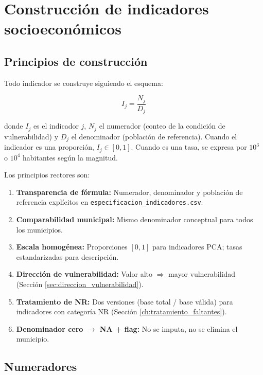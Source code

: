 \section{Construcción de indicadores socioeconómicos}
\label{ch:indicadores}

\subsection{Principios de construcción}
\label{sec:principios_construccion}

Todo indicador se construye siguiendo el esquema:

\begin{equation}
I_j = \frac{N_j}{D_j}
\label{eq:indicador}
\end{equation}

donde $I_j$ es el indicador $j$, $N_j$ el numerador (conteo de la condición de vulnerabilidad) y $D_j$ el denominador (población de referencia). Cuando el indicador es una proporción, $I_j \in [0,1]$. Cuando es una tasa, se expresa por $10^3$ o $10^4$ habitantes según la magnitud.

Los principios rectores son:

\begin{enumerate}
    \item \textbf{Transparencia de fórmula:} Numerador, denominador y población de referencia explícitos en \texttt{especificacion\_indicadores.csv}.
    \item \textbf{Comparabilidad municipal:} Mismo denominador conceptual para todos los municipios.
    \item \textbf{Escala homogénea:} Proporciones $[0,1]$ para indicadores PCA; tasas estandarizadas para descripción.
    \item \textbf{Dirección de vulnerabilidad:} Valor alto $\Rightarrow$ mayor vulnerabilidad (Sección \ref{sec:direccion_vulnerabilidad}).
    \item \textbf{Tratamiento de NR:} Dos versiones (base total / base válida) para indicadores con categoría NR (Sección \ref{ch:tratamiento_faltantes}).
    \item \textbf{Denominador cero $\rightarrow$ NA + flag:} No se imputa, no se elimina el municipio.
\end{enumerate}

\subsection{Numeradores}
\label{sec:numeradores}

